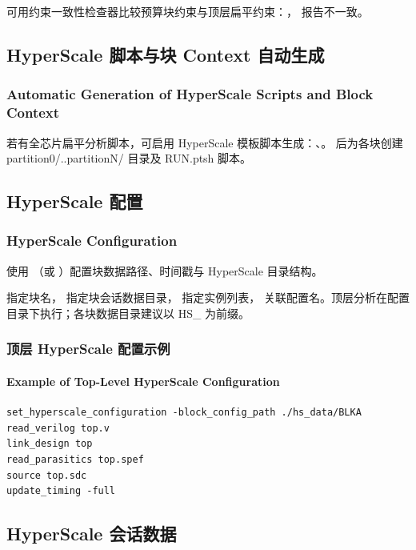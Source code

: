 可用约束一致性检查器比较预算块约束与顶层扁平约束：， 报告不一致。

\subsection{HyperScale 脚本与块 Context 自动生成}
\subsubsection*{Automatic Generation of HyperScale Scripts and Block Context}

若有全芯片扁平分析脚本，可启用 HyperScale 模板脚本生成：、。 后为各块创建 partition0/..partitionN/ 目录及 RUN.ptsh 脚本。

\subsection{HyperScale 配置}
\subsubsection*{HyperScale Configuration}

使用 （或 ）配置块数据路径、时间戳与 HyperScale 目录结构。

 指定块名， 指定块会话数据目录， 指定实例列表， 关联配置名。顶层分析在配置目录下执行；各块数据目录建议以 HS\_ 为前缀。

\subsubsection{顶层 HyperScale 配置示例}
\paragraph*{Example of Top-Level HyperScale Configuration}

\begin{lstlisting}
set_hyperscale_configuration -block_config_path ./hs_data/BLKA
read_verilog top.v
link_design top
read_parasitics top.spef
source top.sdc
update_timing -full
\end{lstlisting}

\subsection{HyperScale 会话数据}
